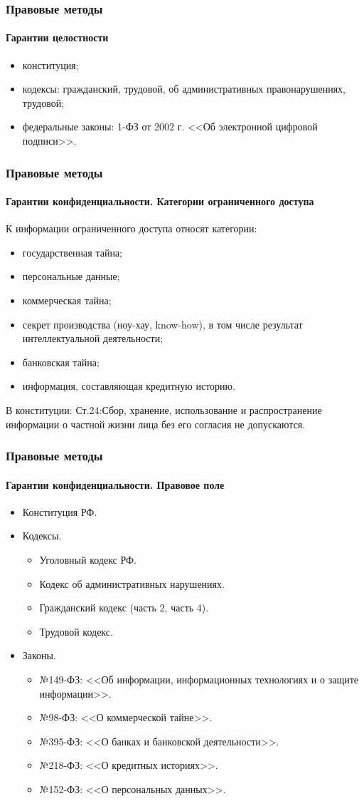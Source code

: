 \begin{frame}
\frametitle{Правовые методы}
\framesubtitle{Гарантии целостности}
\begin{itemize}
    \item конституция;
    \item кодексы: гражданский, трудовой, об административных правонарушениях, трудовой;
    \item федеральные законы: 1-ФЗ от 2002 г. <<Об электронной цифровой подписи>>.
\end{itemize}
\end{frame}


\begin{frame}
\frametitle{Правовые методы}
\framesubtitle{Гарантии конфиденциальности. Категории ограниченного доступа}
К информации ограниченного доступа относят категории:
\begin{itemize}
    \item государственная тайна;
    \item персональные данные;
    \item коммерческая тайна;
    \item секрет производства (ноу-хау, know-how), в том числе результат интеллектуальной деятельности;
    \item банковская тайна;
    \item информация, составляющая кредитную историю.
\end{itemize}
В конституции: \alert{Ст.24:}Сбор, хранение, использование и распространение информации о частной жизни лица без его согласия не допускаются.
\end{frame}


\begin{frame}
\frametitle{Правовые методы}
\framesubtitle{Гарантии конфиденциальности. Правовое поле}

\begin{itemize}
    \item Конституция РФ.
    \item Кодексы.
    \begin{itemize}
        \item Уголовный кодекс РФ.
        \item Кодекс об административных нарушениях.
        \item Гражданский кодекс (часть 2, часть 4).
        \item Трудовой кодекс.
    \end{itemize}
    \item Законы.
    \begin{itemize}
        \item №149-ФЗ: <<Об информации, информационных технологиях и о защите информации>>.
        \item №98-ФЗ: <<О коммерческой тайне>>.
        \item №395-ФЗ: <<О банках и банковской деятельности>>.
        \item №218-ФЗ: <<О кредитных историях>>.
        \item №152-ФЗ: <<О персональных данных>>.
    \end{itemize}
\end{itemize}
\end{frame}


